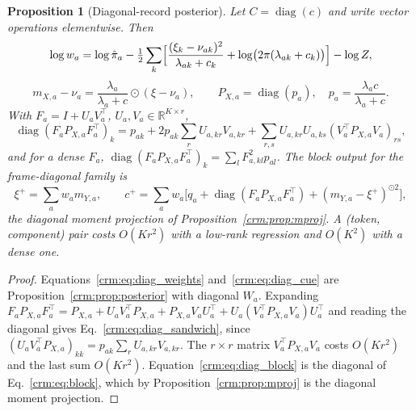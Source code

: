\documentclass[11pt]{article}
\newtheorem{proposition}[theorem]{Proposition}
\theoremstyle{definition}
\theoremstyle{remark}
\newcommand{\R}{\mathbb R}
\newcommand{\diag}{\operatorname{diag}}
\newcommand{\pihat}{\hat\pi}
\begin{document}
\begin{proposition}[Diagonal-record posterior]
\label{crm:prop:diagonal}
Let $C=\diag(c)$ and write vector operations elementwise. Then
\begin{equation}
\log w_a=\log\pihat_a-\tfrac12\sum_k\Bigl[\frac{(\xi_k-\nu_{ak})^2}{\lambda_{ak}+c_k}+\log\bigl(2\pi(\lambda_{ak}+c_k)\bigr)\Bigr]-\log Z,
\label{crm:eq:diag_weights}
\end{equation}
\begin{equation}
m_{X,a}-\nu_a=\frac{\lambda_a}{\lambda_a+c}\odot(\xi-\nu_a),\qquad P_{X,a}=\diag(p_a),\quad p_a=\frac{\lambda_ac}{\lambda_a+c}.
\label{crm:eq:diag_cue}
\end{equation}
With $F_a=I+U_aV_a^\top$, $U_a,V_a\in\R^{K\times r}$,
\begin{equation}
\diag(F_aP_{X,a}F_a^\top)_k=p_{ak}+2p_{ak}\sum_rU_{a,kr}V_{a,kr}+\sum_{r,s}U_{a,kr}U_{a,ks}(V_a^\top P_{X,a}V_a)_{rs},
\label{crm:eq:diag_sandwich}
\end{equation}
and for a dense $F_a$, $\diag(F_aP_{X,a}F_a^\top)_k=\sum_lF_{a,kl}^2p_{al}$. The block output for the frame-diagonal family is
\begin{equation}
\xi^+=\sum_aw_am_{Y,a},\qquad c^+=\sum_aw_a\bigl[q_a+\diag(F_aP_{X,a}F_a^\top)+(m_{Y,a}-\xi^+)^{\odot2}\bigr],
\label{crm:eq:diag_block}
\end{equation}
the diagonal moment projection of Proposition~\ref{crm:prop:mproj}. A (token, component) pair costs $O(Kr^2)$ with a low-rank regression and $O(K^2)$ with a dense one.
\end{proposition}

\begin{proof}
Equations~\eqref{crm:eq:diag_weights} and~\eqref{crm:eq:diag_cue} are Proposition~\ref{crm:prop:posterior} with diagonal $W_a$. Expanding $F_aP_{X,a}F_a^\top=P_{X,a}+U_aV_a^\top P_{X,a}+P_{X,a}V_aU_a^\top+U_a(V_a^\top P_{X,a}V_a)U_a^\top$ and reading the diagonal gives Eq.~\eqref{crm:eq:diag_sandwich}, since $(U_aV_a^\top P_{X,a})_{kk}=p_{ak}\sum_rU_{a,kr}V_{a,kr}$. The $r\times r$ matrix $V_a^\top P_{X,a}V_a$ costs $O(Kr^2)$ and the last sum $O(Kr^2)$. Equation~\eqref{crm:eq:diag_block} is the diagonal of Eq.~\eqref{crm:eq:block}, which by Proposition~\ref{crm:prop:mproj} is the diagonal moment projection.
\end{proof}
\end{document}
